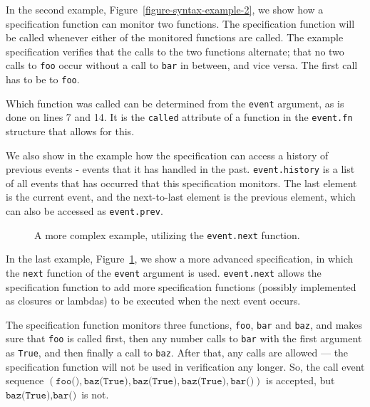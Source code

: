 In the second example, Figure~\ref{figure-syntax-example-2}, we show how a
specification function can monitor two functions. The specification function
will be called whenever either of the monitored functions are called. The
example specification verifies that the calls to the two functions alternate;
that no two calls to \texttt{foo} occur without a call to \texttt{bar} in
between, and vice versa. The first call has to be to \texttt{foo}.

Which function was called can be determined from the \texttt{event} argument,
as is done on lines 7 and 14. It is the \texttt{called} attribute of a function
in the \texttt{event.fn} structure that allows for this.

We also show in the example how the specification can access a history of
previous events - events that it has handled in the past.
\texttt{event.history} is a list of all events that has occurred that this
specification monitors. The last element is the current event, and the
next-to-last element is the previous element, which can also be accessed as
\texttt{event.prev}.

\begin{figure}[h!]
	\begin{center}
	\begin{minipage}{0.7\textwidth}
	
	\end{minipage}
	\end{center}

  \caption{A more complex example, utilizing the \texttt{event.next} function.}
	\label{figure-syntax-example-3}
\end{figure}

In the last example, Figure~\ref{figure-syntax-example-3}, we show a more
advanced specification, in which the \texttt{next} function of the
\texttt{event} argument is used. \texttt{event.next} allows the specification
function to add more specification functions (possibly implemented as closures
or lambdas) to be executed when the next event occurs.

The specification function monitors three functions, \texttt{foo}, \texttt{bar}
and \texttt{baz}, and makes sure that \texttt{foo} is called first, then any
number calls to \texttt{bar} with the first argument as \texttt{True}, and then
finally a call to \texttt{baz}. After that, any calls are allowed --- the
specification function will not be used in verification any longer. So, the
call event sequence $(\texttt{foo()}, \texttt{baz(True)}, \texttt{baz(True)},
\texttt{baz(True)}, \texttt{bar()})$ is accepted, but $\texttt{baz(True)},
\texttt{bar()}$ is not.

